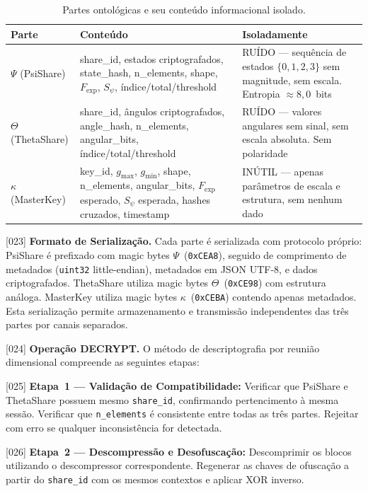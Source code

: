 \documentclass[12pt,a4paper]{article}
\newcommand{\Fexp}{F_{\text{exp}}}
\begin{document}
\begin{table}[H]
\centering
\caption{Partes ontológicas e seu conteúdo informacional
  isolado.}
\label{tab:partes}
\begin{tabular}{p{2.3cm}p{4.5cm}p{5cm}}
\toprule
\textbf{Parte} & \textbf{Conteúdo} & \textbf{Isoladamente} \\
\midrule
$\Psi$ (PsiShare) & share\_id, estados criptografados,
  state\_hash, n\_elements, shape, $\Fexp$, $S_\psi$,
  índice/total/threshold
  & RUÍDO --- sequência de estados $\{0,1,2,3\}$ sem magnitude,
  sem escala. Entropia $\approx 8{,}0$~bits \\[6pt]
$\Theta$ (ThetaShare) & share\_id, ângulos criptografados,
  angle\_hash, n\_elements, angular\_bits,
  índice/total/threshold
  & RUÍDO --- valores angulares sem sinal, sem escala absoluta.
  Sem polaridade \\[6pt]
$\kappa$ (MasterKey) & key\_id, $g_{\max}$, $g_{\min}$, shape,
  n\_elements, angular\_bits, $\Fexp$ esperado, $S_\psi$
  esperada, hashes cruzados, timestamp
  & INÚTIL --- apenas parâmetros de escala e estrutura, sem
  nenhum dado \\
\bottomrule
\end{tabular}
\end{table}

{[023]} \textbf{Formato de Serialização.} Cada parte é
serializada com protocolo próprio: PsiShare é prefixado com
magic bytes $\Psi$~(\texttt{0xCEA8}), seguido de comprimento
de metadados (\texttt{uint32} little-endian), metadados em JSON
UTF-8, e dados criptografados. ThetaShare utiliza magic bytes
$\Theta$~(\texttt{0xCE98}) com estrutura análoga. MasterKey
utiliza magic bytes $\kappa$~(\texttt{0xCEBA}) contendo apenas
metadados. Esta serialização permite armazenamento e
transmissão independentes das três partes por canais separados.

{[024]} \textbf{Operação DECRYPT.} O método de descriptografia
por reunião dimensional compreende as seguintes etapas:

{[025]} \textbf{Etapa~1 --- Validação de Compatibilidade:}
Verificar que PsiShare e ThetaShare possuem mesmo
\texttt{share\_id}, confirmando pertencimento à mesma sessão.
Verificar que \texttt{n\_elements} é consistente entre todas as
três partes. Rejeitar com erro se qualquer inconsistência for
detectada.

{[026]} \textbf{Etapa~2 --- Descompressão e Desofuscação:}
Descomprimir os blocos utilizando o descompressor
correspondente. Regenerar as chaves de ofuscação a partir do
\texttt{share\_id} com os mesmos contextos e aplicar XOR
inverso.
\end{document}
